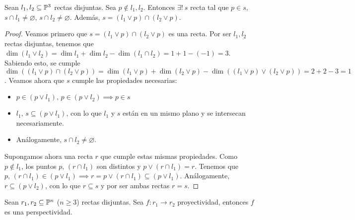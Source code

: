 \begin{lema}
    \label{lema_rectas_poncelet}
    Sean $l_1, l_2 \subseteq \mathbb{P}^3$ rectas disjuntas. Sea $p \not \in 
    l_1, l_2$. Entonces $\exists! \: s$ recta 
    tal que $p \in s$, $s \cap l_1 \neq \varnothing$, 
    $s \cap l_2 \neq \varnothing$. Además, $s = (l_1 \vee p) \cap 
    (l_2 \vee p)$.
\end{lema}
\begin{proof}
    Veamos primero que $s = (l_1 \vee p) \cap (l_2 \vee p)$ es una
    recta. Por ser $l_1, l_2$ rectas disjuntas, tenemos que $\dim
    (l_1 \vee l_2) = \dim l_1 + \dim l_2 - \dim (l_1 \cap l_2) = 1 + 1 - (-1) = 3$.
    Sabiendo esto, se cumple $\dim ((l_1 \vee p) \cap (l_2 \vee p)) = 
    \dim (l_1 \vee p) + \dim(l_2 \vee p) - \dim ((l_1 \vee p) \vee (l_2 \vee p)) =
    2 + 2 - 3 = 1$. Veamos ahora que $s$ cumple las propiedades
    necesarias: 
    \begin{itemize}
      \item $p \in (p \vee l_1), \, p \in (p \vee l_2) \implies
      p \in s$
      \item $l_1, \, s \subseteq (p \vee l_1)$, con lo que $l_1$ y $s$ están en un
      mismo plano y se intersecan necesariamente.
      \item Análogamente, $s \cap l_2 \neq \varnothing$.
    \end{itemize}
    
    Supongamos ahora una recta $r$ que cumple estas mismas propiedades.
    Como $p \not \in l_1$, los puntos $p, \, (r \cap l_1)$ son distintos y
    $p \vee (r \cap l_1) = r$. Tenemos que $p, \, (r \cap l_1) \in
    (p \vee l_1) \implies r = p \vee (r \cap l_1) \subseteq (p \vee l_1)$. Análogamente,
    $r \subseteq (p \vee l_2)$, con lo que $r \subseteq s$ y por ser ambas rectas
    $r = s$.
    
\end{proof}
\begin{teo*} %
    Sean $r_1, r_2 \subseteq \mathbb{P}^n$ ($n \geq 3$) rectas disjuntas.
    Sea $f \colon r_1 \to r_2$ proyectividad, entonces $f$
    es una perspectividad. 
\end{teo*}


